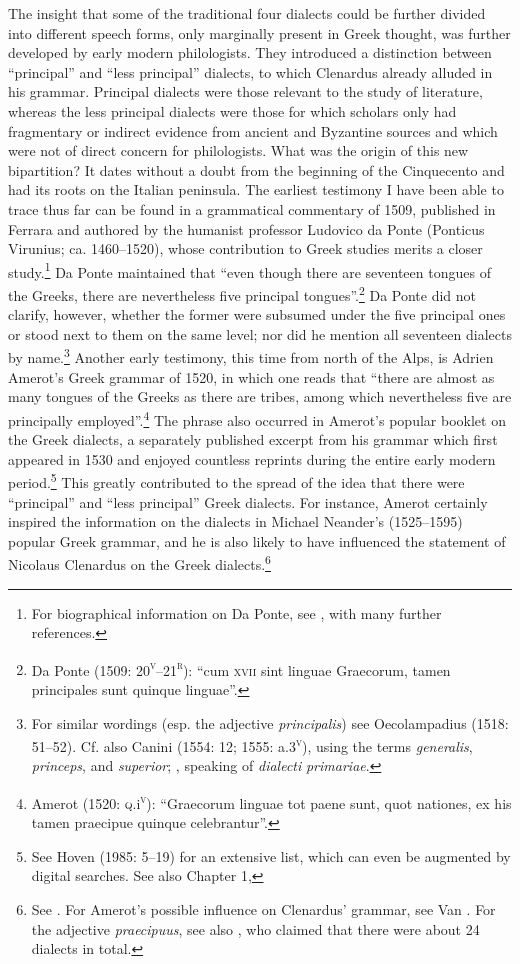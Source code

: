 \documentclass[output=paper]{langsci/langscibook}
\begin{document}
The insight that some of the traditional four dialects could be further divided into different speech forms, only marginally present in Greek thought, was further developed by early modern philologists. They introduced a distinction between “principal” and “less principal” dialects, to which Clenardus already alluded in his grammar. Principal dialects were those relevant to the study of literature, whereas the less principal dialects were those for which scholars only had fragmentary or indirect evidence from ancient and Byzantine sources and which were not of direct concern for philologists. What was the origin of this new bipartition? It dates without a doubt from the beginning of the Cinquecento and had its roots on the Italian peninsula. The earliest testimony I have been able to trace thus far can be found in a grammatical commentary of 1509, published in Ferrara and authored by the humanist professor Ludovico da Ponte (Ponticus Virunius; ca. 1460–1520), whose contribution to Greek studies merits a closer study.\footnote{For biographical information on Da Ponte, see \citet{Ricciardi1986}, with many further references.} Da Ponte maintained that “even though there are seventeen tongues of the Greeks, there are nevertheless five principal tongues”.\footnote{Da Ponte (1509: 20\textsc{\textsuperscript{v}}–21\textsc{\textsuperscript{r}}): “cum \textsc{xvii} sint linguae Graecorum, tamen principales sunt quinque linguae”.} Da Ponte did not clarify, however, whether the former were subsumed under the five principal ones or stood next to them on the same level; nor did he mention all seventeen dialects by name.\footnote{For similar wordings (esp. the adjective \textit{principalis}) see Oecolampadius (1518: 51–52). Cf. also Canini (1554: 12; 1555: a.3\textsc{\textsuperscript{v}}), using the terms \textit{generalis}, \textit{princeps}, and \textit{superior}; \citet[2]{Walper1589}, speaking of \textit{dialecti} \textit{primariae}.} Another early testimony, this time from north of the Alps, is Adrien Amerot’s Greek grammar of 1520, in which one reads that “there are almost as many tongues of the Greeks as there are tribes, among which nevertheless five are principally employed”.\footnote{Amerot (1520: \textsc{q}.i\textsc{\textsuperscript{v}}): “Graecorum linguae tot paene sunt, quot nationes, ex his tamen praecipue quinque celebrantur”.} The phrase also occurred in Amerot’s popular booklet on the Greek dialects, a separately published excerpt from his grammar which first appeared in 1530 and enjoyed countless reprints during the entire early modern period.\footnote{See Hoven (1985: 5–19) for an extensive list, which can even be augmented by digital searches. See also Chapter 1, } This greatly contributed to the spread of the idea that there were “principal” and “less principal” Greek dialects. For instance, Amerot certainly inspired the information on the dialects in Michael Neander’s (1525–1595) popular Greek grammar, and he is also likely to have influenced the statement of Nicolaus Clenardus on the Greek dialects.\footnote{See \citet[187]{Neander1553}. For Amerot’s possible influence on Clenardus’ grammar, see Van \citet{Rooy2019}. For the adjective \textit{praecipuus}, see also \citet[42]{Mosellanus1527}, who claimed that there were about 24 dialects in total.}
\end{document}
